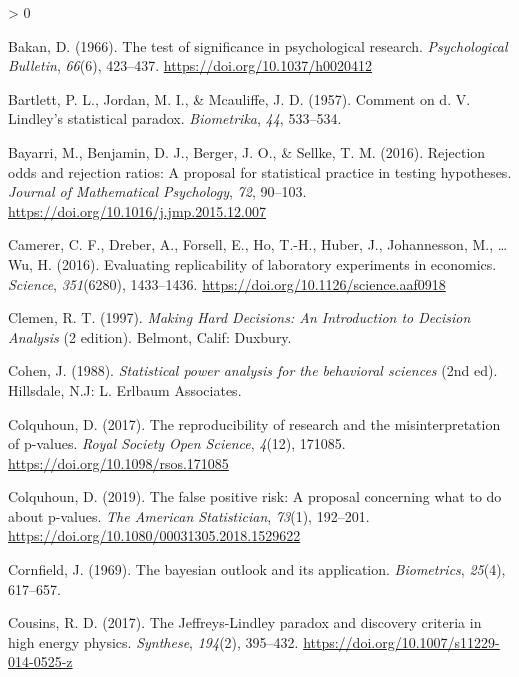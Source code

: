 \documentclass[
  english,
  ,man, a4paper,floatsintext]{apa6}
\newlength{\cslhangindent}
\newenvironment{CSLReferences}[2] %
 {%
  \setlength{\parindent}{0pt}
  \ifodd #1 \everypar{\setlength{\hangindent}{\cslhangindent}}\ignorespaces\fi
  \ifnum #2 > 0
  \setlength{\parskip}{#2\baselineskip}
  \fi
 }%
 {}
\begin{document}
\hypertarget{refs}{}
\begin{CSLReferences}{1}{0}
\leavevmode\hypertarget{ref-bakan_test_1966}{}%
Bakan, D. (1966). The test of significance in psychological research. \emph{Psychological Bulletin}, \emph{66}(6), 423--437. \url{https://doi.org/10.1037/h0020412}

\leavevmode\hypertarget{ref-bartlett1957comment}{}%
Bartlett, P. L., Jordan, M. I., \& Mcauliffe, J. D. (1957). Comment on d. V. Lindley's statistical paradox. \emph{Biometrika}, \emph{44}, 533--534.

\leavevmode\hypertarget{ref-bayarri2016rejection}{}%
Bayarri, M., Benjamin, D. J., Berger, J. O., \& Sellke, T. M. (2016). Rejection odds and rejection ratios: A proposal for statistical practice in testing hypotheses. \emph{Journal of Mathematical Psychology}, \emph{72}, 90--103. \url{https://doi.org/10.1016/j.jmp.2015.12.007}

\leavevmode\hypertarget{ref-camerer_2016}{}%
Camerer, C. F., Dreber, A., Forsell, E., Ho, T.-H., Huber, J., Johannesson, M., \ldots{} Wu, H. (2016). Evaluating replicability of laboratory experiments in economics. \emph{Science}, \emph{351}(6280), 1433--1436. \url{https://doi.org/10.1126/science.aaf0918}

\leavevmode\hypertarget{ref-clemen_making_1997}{}%
Clemen, R. T. (1997). \emph{Making {Hard} {Decisions}: {An} {Introduction} to {Decision} {Analysis}} (2 edition). Belmont, Calif: Duxbury.

\leavevmode\hypertarget{ref-cohen_statistical_1988}{}%
Cohen, J. (1988). \emph{Statistical power analysis for the behavioral sciences} (2nd ed). {Hillsdale, N.J}: {L. Erlbaum Associates}.

\leavevmode\hypertarget{ref-colquhoun_reproducibility_2017}{}%
Colquhoun, D. (2017). The reproducibility of research and the misinterpretation of p-values. \emph{Royal Society Open Science}, \emph{4}(12), 171085. \url{https://doi.org/10.1098/rsos.171085}

\leavevmode\hypertarget{ref-colquhoun_false_2019}{}%
Colquhoun, D. (2019). The false positive risk: A proposal concerning what to do about p-values. \emph{The American Statistician}, \emph{73}(1), 192--201. \url{https://doi.org/10.1080/00031305.2018.1529622}

\leavevmode\hypertarget{ref-cornfield1969bayesian}{}%
Cornfield, J. (1969). The bayesian outlook and its application. \emph{Biometrics}, \emph{25}(4), 617--657.

\leavevmode\hypertarget{ref-cousins_jeffreyslindley_2017}{}%
Cousins, R. D. (2017). The {Jeffreys}-{Lindley} paradox and discovery criteria in high energy physics. \emph{Synthese}, \emph{194}(2), 395--432. \url{https://doi.org/10.1007/s11229-014-0525-z}


\end{CSLReferences}
\end{document}
